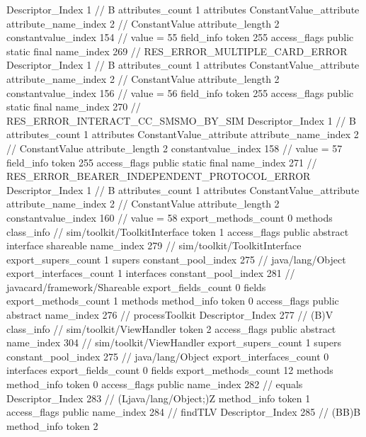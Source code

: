 {{{{{				Descriptor_Index	1		// B
				attributes_count	1
				attributes {
				ConstantValue_attribute {
					attribute_name_index	2		// ConstantValue
					attribute_length	2
					constantvalue_index	154		// value = 55
				}
				}
			}
			field_info {
				token	255
				access_flags	public static final
				name_index	269		// RES_ERROR_MULTIPLE_CARD_ERROR
				Descriptor_Index	1		// B
				attributes_count	1
				attributes {
				ConstantValue_attribute {
					attribute_name_index	2		// ConstantValue
					attribute_length	2
					constantvalue_index	156		// value = 56
				}
				}
			}
			field_info {
				token	255
				access_flags	public static final
				name_index	270		// RES_ERROR_INTERACT_CC_SMSMO_BY_SIM
				Descriptor_Index	1		// B
				attributes_count	1
				attributes {
				ConstantValue_attribute {
					attribute_name_index	2		// ConstantValue
					attribute_length	2
					constantvalue_index	158		// value = 57
				}
				}
			}
			field_info {
				token	255
				access_flags	public static final
				name_index	271		// RES_ERROR_BEARER_INDEPENDENT_PROTOCOL_ERROR
				Descriptor_Index	1		// B
				attributes_count	1
				attributes {
				ConstantValue_attribute {
					attribute_name_index	2		// ConstantValue
					attribute_length	2
					constantvalue_index	160		// value = 58
				}
				}
			}
			}
			export_methods_count	0
			methods {
			}
		}
		class_info {		// sim/toolkit/ToolkitInterface
			token	1
			access_flags	public abstract interface shareable
			name_index	279		// sim/toolkit/ToolkitInterface
			export_supers_count	1
			supers {
				constant_pool_index	275		// java/lang/Object
			}
			export_interfaces_count	1
			interfaces {
				constant_pool_index	281		// javacard/framework/Shareable
			}
			export_fields_count	0
			fields {
			}
			export_methods_count	1
			methods {
				method_info {
					token	0
					access_flags	public abstract
					name_index	276		// processToolkit
					Descriptor_Index	277		// (B)V
				}
			}
		}
		class_info {		// sim/toolkit/ViewHandler
			token	2
			access_flags	public abstract
			name_index	304		// sim/toolkit/ViewHandler
			export_supers_count	1
			supers {
				constant_pool_index	275		// java/lang/Object
			}
			export_interfaces_count	0
			interfaces {
			}
			export_fields_count	0
			fields {
			}
			export_methods_count	12
			methods {
				method_info {
					token	0
					access_flags	public
					name_index	282		// equals
					Descriptor_Index	283		// (Ljava/lang/Object;)Z
				}
				method_info {
					token	1
					access_flags	public
					name_index	284		// findTLV
					Descriptor_Index	285		// (BB)B
				}
				method_info {
					token	2
}}}}}

